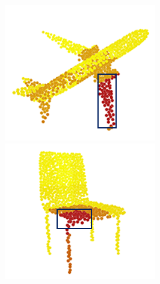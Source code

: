 \documentclass[letterpaper]{article}
\begin{document}
\begin{figure}[htbp]
\begin{center}
\begin{minipage}[b]{0.8\linewidth}
\begin{center}
\begin{minipage}[b]{0.12\linewidth}
\begin{center}
\end{center}
\end{minipage}
\begin{minipage}[b]{0.12\linewidth}
\begin{center}
\includegraphics[width=1.0\linewidth]{images/atten_pic/airplane_attention_3.png}
\end{center}
\end{minipage}
\begin{minipage}[b]{0.12\linewidth}
\begin{center}
\includegraphics[width=1.0\linewidth]{images/atten_pic/chair_attention_1.png}

\end{center}
\end{minipage}
\end{center}
\end{minipage}
\end{center}
\end{figure}
\end{document}
